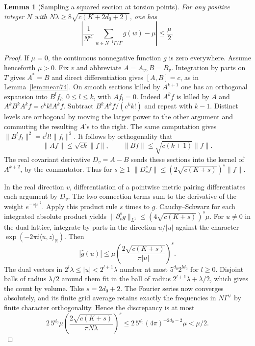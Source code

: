 \documentclass[a4paper,11pt]{article}
\newtheorem{lemma}[proposition]{Lemma}
\theoremstyle{definition}
\theoremstyle{remark}
\newcommand{\RR}{\mathbb R}\newcommand{\CC}{\mathbb C}\newcommand{\QQ}{\mathbb Q}
\numberwithin{equation}{section}
\begin{document}
\begin{lemma}[Sampling a squared section at torsion points]\leavevmode\label{lem:grid85}
For any positive integer \(N\) with
\(N\lambda\ge8\sqrt{c(K+2d_0+2)}\), one has
\[
 \left|\frac1{N^{d_0}}\sum_{w\in N^{-1}\Gamma/\Gamma}g(w)-\mu\right|
     \le \frac{\mu}{2}.
\]
\end{lemma}
\begin{proof}
If \(\mu=0\), the continuous nonnegative function \(g\) is zero
everywhere. Assume henceforth \(\mu>0\).
Fix \(v\) and abbreviate \(A=A_v,B=B_v\).
Integration by parts on \(T\) gives \(A^*=B\) and direct
differentiation gives \([A,B]=c\), as in Lemma~\ref{lem:mean74}.
On smooth sections killed by \(A^{k+1}\) one has an orthogonal
expansion into \(B^l f_l\), \(0\le l\le k\), with \(Af_l=0\).
Indeed \(A^k f\) is killed by \(A\) and
\(A^kB^k A^kf=c^k k!A^kf\). Subtract
\(B^k A^k f/(c^k k!)\) and repeat with \(k-1\).
Distinct levels are orthogonal by moving the larger power to
the other argument and commuting the resulting \(A\)'s to the right.
The same computation gives
\(\|B^l f_l\|^2=c^l l!\|f_l\|^2\). It follows by orthogonality that
\[
       \|Af\|\le\sqrt{ck}\|f\|,\qquad
       \|Bf\|\le\sqrt{c(k+1)}\|f\|.
\]
The real covariant derivative \(D_v=A-B\) sends these sections
into the kernel of \(A^{k+2}\), by the commutator. Thus for \(s\ge1\)
\(\|D_v^s f\|\le(2\sqrt{c(K+s)})^s\|f\|\).

In the real direction \(v\), differentiation of a pointwise
metric pairing differentiates each argument by \(D_v\). The
two connection terms sum to the derivative of the weight
\(e^{-c|z|^2}\). Apply this product rule \(s\) times to \(g\).
Cauchy--Schwarz for each integrated absolute product yields
\(\|\partial_v^s g\|_{L^1}\le(4\sqrt{c(K+s)})^s\mu\).
For \(u\ne0\) in the dual lattice, integrate by parts in the
direction \(u/|u|\) against the character
\(\exp(-2\pi i\langle u,z\rangle_{\RR})\). Then
\[
 |\widehat g(u)|\le
       \mu\left(\frac{2\sqrt{c(K+s)}}{\pi |u|}\right)^s .
\]
The dual vectors in \(2^l\lambda\le|u|<2^{l+1}\lambda\)
number at most \(5^{d_0}2^{ld_0}\) for \(l\ge0\). Disjoint
balls of radius \(\lambda/2\) around them fit in the ball of
radius \(2^{l+1}\lambda+\lambda/2\), which gives the count by volume.
Take \(s=2d_0+2\). The Fourier series now converges absolutely,
and its finite grid average retains exactly the frequencies
in \(N\Gamma^\vee\) by finite character orthogonality. Hence
the discrepancy is at most
\[
 2\,5^{d_0}\mu\left(\frac{2\sqrt{c(K+s)}}{\pi N\lambda}\right)^s
 \le 2\,5^{d_0}(4\pi)^{-2d_0-2}\mu<\mu/2 .
\]
\end{proof}
\end{document}
